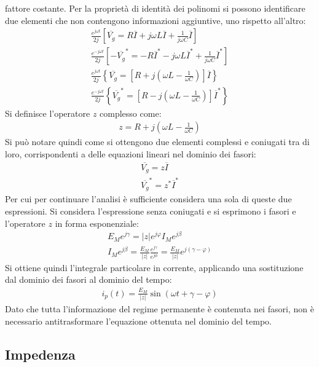 \documentclass{article}
\numberwithin{equation}{subsection}
\begin{document}
fattore costante. Per la proprietà di identità dei polinomi si possono identificare due elementi che non contengono informazioni aggiuntive, uno rispetto all'altro: 
\begin{gather*}
    \displaystyle\frac{e^{j\omega t}}{2j}\left[\overline{V_g}=R\overline{I}+j\omega L\overline{I}+\frac{1}{j\omega C}\overline{I}\right]\\
    \displaystyle\frac{e^{-j\omega t}}{2j}\left[-\overline{V_g}^*=-R\overline{I}^*-j\omega L\overline{I}^*+\frac{1}{j\omega C}\overline{I}^*\right]\\
    \displaystyle\frac{e^{j\omega t}}{2j}\left\{\overline{V_g}=\left[R+j\left(\omega L-\frac{1}{\omega C}\right)\right]\overline{I}\right\}\\
    \displaystyle\frac{e^{-j\omega t}}{2j}\left\{\overline{V_g}^*=\left[R-j\left(\omega L-\frac{1}{\omega C}\right)\right]\overline{I}^*\right\}
\end{gather*}
Si definisce l'operatore $z$ complesso come:
\begin{gather*}
    z=R+j\left(\omega L-\displaystyle\frac{1}{\omega C}\right)
\end{gather*}
Si può notare quindi come si ottengono due elementi complessi e coniugati tra di loro, corrispondenti a delle equazioni lineari nel dominio dei fasori:
\begin{gather*}
    \overline{V_g}=z\overline{I}\\
    \overline{V_g}^*=z^*\overline{I}^*
\end{gather*}
Per cui per continuare l'analisi è sufficiente considera una sola di queste due espressioni. Si considera l'espressione senza coniugati e si esprimono i fasori e l'operatore 
$z$ in forma esponenziale:
\begin{gather*}
    E_Me^{j\gamma}=|z|e^{j\varphi}I_Me^{j\beta}\\
    I_Me^{j\beta}=\displaystyle\frac{E_M}{|z|}\frac{e^{j\gamma}}{e^{j\phi}}=\frac{E_M}{|z|}e^{j(\gamma-\varphi)}
\end{gather*} 
Si ottiene quindi l'integrale particolare in corrente, applicando una sostituzione dal dominio dei fasori al dominio del tempo:
\begin{gather*}
    i_p(t)=\displaystyle\frac{E_M}{|z|}\sin(\omega t+\gamma-\varphi)
\end{gather*}
Dato che tutta l'informazione del regime permanente è contenuta nei fasori, non è necessario antitrasformare l'equazione ottenuta nel dominio del tempo. 

\subsection{Impedenza}
\end{document}
